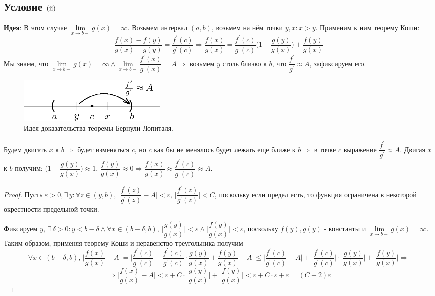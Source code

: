 \documentclass[12pt]{article}
\newcommand{\RN}[1]{%
	\textup{\uppercase\expandafter{\romannumeral#1}}%
}
\newcommand{\VE}{\varepsilon}
\theoremstyle{definition}
\begin{document}
\subsection*{Условие $(\RN{2})$}
\uline{\textbf{Идея}}: В этом случае $\lim\limits_{x \to b-}g(x) = \infty$. Возьмем интервал $(a,b)$, возьмем на нём точки $y, x \colon x > y$. 
Применим к ним теорему Коши: 
$$\dfrac{f(x) - f(y)}{g(x) - g(y)} = \dfrac{f^\prime(c)}{g^\prime(c)} \Rightarrow \dfrac{f(x)}{g(x)} = \dfrac{f^\prime(c)}{g^\prime(c)} \bigg(1 - \dfrac{g(y)}{g(x)} \bigg) + \dfrac{f(y)}{g(x)}$$
Мы знаем, что $\lim\limits_{x \to b-}g(x) = \infty \wedge \lim\limits_{x \to b-}\dfrac{f^\prime(x)}{g^\prime(x)} = A \Rightarrow$ возьмем $y$ столь близко к $b$, что $\dfrac{f^\prime}{g^\prime} \approx A$, зафиксируем его. 
\begin{figure}[H]
	\centering
	\includegraphics[width=0.35\textwidth]{24_2.eps}
	\caption{Идея доказательства теоремы Бернули-Лопиталя.}
	\label{24_2}
\end{figure}
Будем двигать $x$ к $b \Rightarrow$ будет изменяться $c$, но $c$ как бы не менялось будет лежать еще ближе к $b \Rightarrow$ в точке $c$ выражение $\dfrac{f^\prime}{g^\prime} \approx A$. Двигая $x$ к $b$ получим: $\bigg(1 - \dfrac{g(y)}{g(x)} \bigg) \approx 1, \, \dfrac{f(y)}{g(x)} \approx 0 \Rightarrow \dfrac{f(x)}{g(x)} \approx  \dfrac{f^\prime(c)}{g^\prime(c)} \approx A$. 
\begin{proof} 
	Пусть $\VE > 0, \exists \, y \colon  \forall z \in (y,b), \, \bigg|\dfrac{f^\prime(z)}{g^\prime(z)} - A\bigg| < \VE, \, \bigg|\dfrac{f^\prime(z)}{g^\prime(z)}\bigg| < C$, поскольку если предел есть, то функция ограничена в некоторой окрестности предельной точки. 
	
	Фиксируем $y$, $\exists \, \delta >0 \colon y < b -\delta \wedge \forall x \in (b -\delta,b), \, \bigg| \dfrac{g(y)}{g(x)} \bigg|< \VE \wedge \bigg|\dfrac{f(y)}{g(x)}\bigg| < \VE$, поскольку $f(y),g(y)$ - константы и $\!\lim\limits_{x \to b-}g(x) = \infty$. Таким образом, применяя теорему Коши и неравенство треугольника получим
	$$\forall x \in (b-\delta, b), \, \bigg|\dfrac{f(x)}{g(x)} - A \bigg| = \bigg|\dfrac{f^\prime(c)}{g^\prime(c)}  - \dfrac{f^\prime(c)}{g^\prime(c)}{\cdot}\dfrac{g(y)}{g(x)} + \dfrac{f(y)}{g(x)} - A \bigg| \leq \bigg|\dfrac{f^\prime(c)}{g^\prime(c)} - A \bigg| + \bigg|\dfrac{f^\prime(c)}{g^\prime(c)} \bigg|{\cdot}\bigg|\dfrac{g(y)}{g(x)}\bigg| + \bigg|\dfrac{f(y)}{g(x)}\bigg| \Rightarrow $$
	$$\Rightarrow \bigg|\dfrac{f(x)}{g(x)} - A \bigg| < \VE + C{\cdot}\bigg|\dfrac{g(y)}{g(x)}\bigg| + \bigg|\dfrac{f(y)}{g(x)}\bigg| < \VE + C{\cdot}\VE + \VE = (C+ 2)\VE$$
\end{proof}
\end{document}
